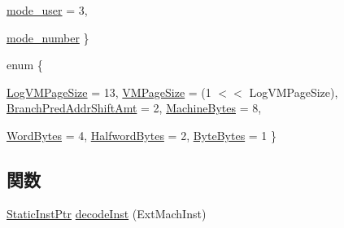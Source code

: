 \begin{DoxyCompactItemize}
\hyperlink{namespaceAlphaISA_a19269c193c0c4866cdc4e5abd433f9fcac1644b8fa5c8123b58d6ca56eda84972}{mode\_\-user} =  3, 
\par
\hyperlink{namespaceAlphaISA_a19269c193c0c4866cdc4e5abd433f9fca83ebd1b275cc6ddc8dfea9c58297859b}{mode\_\-number}
 \}
\item 
enum \{ \par
\hyperlink{namespaceAlphaISA_a06fc87d81c62e9abb8790b6e5713c55ba4bf6471bc0cacbced4fb7c20d5b62ed2}{LogVMPageSize} =  13, 
\hyperlink{namespaceAlphaISA_a06fc87d81c62e9abb8790b6e5713c55babe0c83362ff9a394bc07b0e26f089b83}{VMPageSize} =  (1 $<$$<$ LogVMPageSize), 
\hyperlink{namespaceAlphaISA_a06fc87d81c62e9abb8790b6e5713c55bab6e27fddecb5ea8a8f85df1cf2f19698}{BranchPredAddrShiftAmt} =  2, 
\hyperlink{namespaceAlphaISA_a06fc87d81c62e9abb8790b6e5713c55badd93150507c751debeaefa48d8a8cfe5}{MachineBytes} =  8, 
\par
\hyperlink{namespaceAlphaISA_a06fc87d81c62e9abb8790b6e5713c55ba2c71f93071b4020680d196ef87d692be}{WordBytes} =  4, 
\hyperlink{namespaceAlphaISA_a06fc87d81c62e9abb8790b6e5713c55ba2655c394d414a250fb7613c44cd91e11}{HalfwordBytes} =  2, 
\hyperlink{namespaceAlphaISA_a06fc87d81c62e9abb8790b6e5713c55ba99641f26e588b76bc6abc64c745a5f65}{ByteBytes} =  1
 \}
\end{DoxyCompactItemize}
\subsection*{関数}
\begin{DoxyCompactItemize}
\item 
\hyperlink{classRefCountingPtr}{StaticInstPtr} \hyperlink{namespaceAlphaISA_aef30743e4d38e3498eb69d368026c8f8}{decodeInst} (ExtMachInst)
\end{DoxyCompactItemize}
